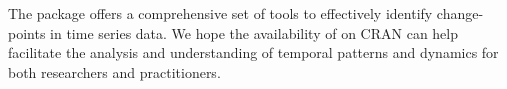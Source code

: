 The  package offers a comprehensive set of tools to effectively identify change-points in time series data. We hope the availability of  on CRAN can help facilitate the analysis and understanding of temporal patterns and dynamics for both researchers and practitioners.







